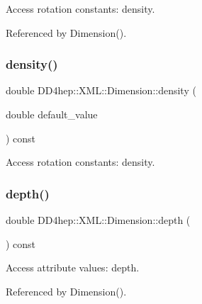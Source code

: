 Access rotation constants\+: density. 



Referenced by Dimension().

\hypertarget{struct_d_d4hep_1_1_x_m_l_1_1_dimension_a3fabac7226c38908bcbe79a1a1b3a69d}{}\label{struct_d_d4hep_1_1_x_m_l_1_1_dimension_a3fabac7226c38908bcbe79a1a1b3a69d} 
\subsubsection{\texorpdfstring{density()}{density()}\hspace{0.1cm}{\footnotesize\ttfamily [2/2]}}
{\footnotesize\ttfamily double D\+D4hep\+::\+X\+M\+L\+::\+Dimension\+::density (\begin{DoxyParamCaption}\item[{double}]{default\+\_\+value }\end{DoxyParamCaption}) const}



Access rotation constants\+: density. 

\hypertarget{struct_d_d4hep_1_1_x_m_l_1_1_dimension_a46b409212807ae5df6f3c1997614ccb4}{}\label{struct_d_d4hep_1_1_x_m_l_1_1_dimension_a46b409212807ae5df6f3c1997614ccb4} 
\subsubsection{\texorpdfstring{depth()}{depth()}}
{\footnotesize\ttfamily double D\+D4hep\+::\+X\+M\+L\+::\+Dimension\+::depth (\begin{DoxyParamCaption}{ }\end{DoxyParamCaption}) const}



Access attribute values\+: depth. 



Referenced by Dimension().

\hypertarget{struct_d_d4hep_1_1_x_m_l_1_1_dimension_afac2d2f56929e6d5445128529ab14bb1}{}\label{struct_d_d4hep_1_1_x_m_l_1_1_dimension_afac2d2f56929e6d5445128529ab14bb1} 
